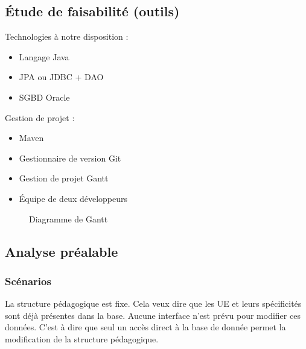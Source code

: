 \documentclass{article}
\begin{document}
\subsection{\'Etude de faisabilité (outils)}
Technologies à notre disposition :
\begin{itemize}
\item Langage Java
\item JPA ou JDBC + DAO
\item SGBD Oracle
\end{itemize}

Gestion de projet :
\begin{itemize}
\item Maven
\item Gestionnaire de version Git
\item Gestion de projet Gantt
\item \'Equipe de deux développeurs
\end{itemize}

\begin{figure}[!h]
\begin{center}
\end{center}
\caption{Diagramme de Gantt}
\end{figure}

\subsection{Analyse préalable}

\subsubsection{Scénarios}
La structure pédagogique est fixe. Cela veux dire que les UE et leurs spécificités sont déjà présentes dans la base. Aucune interface n'est prévu pour modifier ces données. C'est à dire que seul un accès direct à la base de donnée permet la modification de la structure pédagogique.
\end{document}
